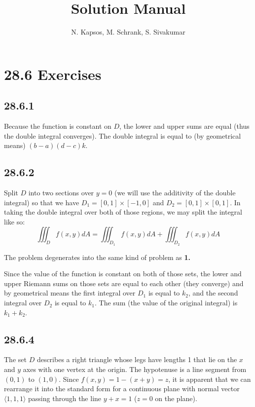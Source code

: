 \documentclass{article}
\title{Solution Manual}
\author{N. Kapsos, M. Schrank, S. Sivakumar}
\date{}
\begin{document}
\maketitle
\setcounter{secnumdepth}{0}

\section{28.6 Exercises}

\subsection{28.6.1}

Because the function is constant on $D$, the lower and upper sums are equal (thus the double integral converges). The double integral is equal to (by geometrical means) $(b-a)(d-c)k$.

\subsection{28.6.2}

Split $D$ into two sections over $y=0$ (we will use the additivity of the double integral) so that we have $D_1 = [0,1]\times[-1,0]$ and $D_2 = [0,1]\times[0,1]$. In taking the double integral over both of those regions, we may split the integral like so:
$$\iiint_D f(x,y)dA = \iiint_{D_1} f(x,y)dA + \iiint_{D_2} f(x,y)dA$$

The problem degenerates into the same kind of problem as \textbf{1.}

Since the value of the function is constant on both of those sets, the lower and upper Riemann sums on those sets are equal to each other (they converge) and by geometrical means the first integral over $D_1$ is equal to $k_2$, and the second integral over $D_2$ is equal to $k_1$. The sum (the value of the original integral) is $k_1+k_2$.

\subsection{28.6.4}

The set $D$ describes a right triangle whose legs have lengths 1 that lie on the $x$ and $y$ axes with one vertex at the origin. The hypotenuse is a line segment from $(0,1)$ to $(1,0)$. Since $f(x,y) = 1-(x+y) = z$, it is apparent that we can rearrange it into the standard form for a continuous plane with normal vector $\langle 1,1,1 \rangle$ passing through the line $y+x = 1$ ($z=0$ on the plane). 
\end{document}

